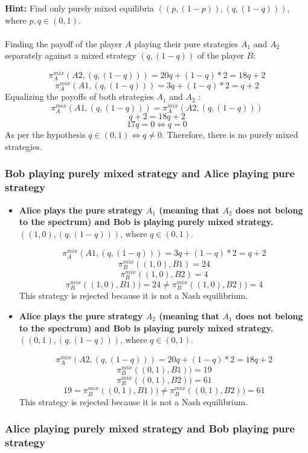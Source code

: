 \documentclass{article}
\begin{document}
\textbf{Hint:} Find only purely mixed equilibria $( (p, (1 - p)), (q, (1 - q ) ) )$, where $p, q \in (0, 1)$. \\
\\
Finding the payoff of the player $A$ playing their pure strategies $A_1$ and $A_2$ separately against a mixed strategy $(q, (1 - q ))$ of the player $B$:

$$\pi^{mix}_A ( A2, (q, (1 - q) ) ) =  20q + (1 - q) * 2 = 18q + 2$$
$$\pi^{mix}_A ( A1, (q, (1 - q) ) ) =  3q + (1 - q) * 2 = q + 2$$
Equalizing the payoffs of both strategies $A_1$ and $A_2$ :
$$
\pi^{mix}_A ( A1, (q, (1 - q ) ) ) = \pi^{mix}_A ( A2, (q, (1 - q ) ) )$$ $$ q + 2 = 18q + 2$$  $$17q =0 \iff q = 0
$$
As per the hypothesis $q \in (0, 1) \iff q \neq 0$. Therefore, there is no purely mixed strategies.


\subsubsection{Bob playing purely mixed strategy and Alice playing pure strategy}
\begin{itemize}
    \item \textbf{Alice plays the pure strategy $A_1$ (meaning that $A_2$ does not belong to the spectrum) and Bob is playing  purely mixed strategy.} $( (1, 0), (q, (1 - q ) ) )$, where $q \in (0, 1)$.

$$\pi^{mix}_A ( A1, (q, (1 - q ) ) ) = 3q + (1 - q)*2 = q + 2$$
$$\pi^{mix}_B ( (1, 0), B1 ) =  24$$ 
$$\pi^{mix}_B ( (1, 0), B2 ) =  4$$
$$\pi^{mix}_B ( (1, 0), B1 ) ) = 24 \neq \pi^{mix}_B ( (1, 0), B2 ) ) =  4$$
This strategy is rejected because it is not a Nash equilibrium.

    \item 
\textbf{Alice plays the pure strategy $A_2$ (meaning that $A_1$ does not belong to the spectrum) and Bob is playing  purely mixed strategy.} $( (0, 1), (q, (1 - q ) ) )$, where $q \in (0, 1)$. 

$$\pi^{mix}_A ( A2, (q, (1 - q ) ) ) = 20q + (1 - q)*2 = 18q + 2$$
$$\pi^{mix}_B ( (0, 1), B1 ) ) =  19$$
$$\pi^{mix}_B ( (0, 1), B2 ) ) =  61$$
$$19 = \pi^{mix}_B ( (0, 1), B1 ) ) \neq \pi^{mix}_B ( (0, 1), B2 ) ) =  61$$
This strategy is rejected because it is not a Nash equilibrium.
\end{itemize}


\subsubsection{Alice playing purely mixed strategy and Bob playing pure strategy}
\end{document}
